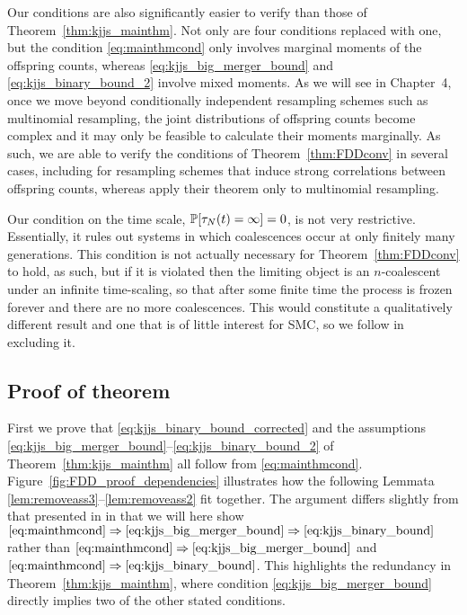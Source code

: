 Our conditions are also significantly easier to verify than those of Theorem~\ref{thm:kjjs_mainthm}. Not only are four conditions replaced with one, but the condition \eqref{eq:mainthmcond} only involves marginal moments of the offspring counts, whereas \eqref{eq:kjjs_big_merger_bound} and \eqref{eq:kjjs_binary_bound_2} involve mixed moments. 
As we will see in Chapter~4, once we move beyond conditionally independent resampling schemes such as multinomial resampling, the joint distributions of offspring counts become complex and it may only be feasible to calculate their moments marginally. 
As such, we are able to verify the conditions of Theorem~\ref{thm:FDDconv} in several cases, including for resampling schemes that induce strong correlations between offspring counts, whereas \textcite{koskela2018} apply their theorem only to multinomial resampling.

Our condition on the time scale, $\mathbb{P}[ \tau_N(t) = \infty ] =0$, is not very restrictive. Essentially, it rules out systems in which coalescences occur at only finitely many generations. 
This condition is not actually necessary for Theorem~\ref{thm:FDDconv} to hold, as such, but if it is violated then the limiting object is an $n$-coalescent under an infinite time-scaling, so that after some finite time the process is frozen forever and there are no more coalescences.
This would constitute a qualitatively different result and one that is of little interest for SMC, so we follow \textcite{mohle1998} in excluding it.


\subsection{Proof of theorem}

First we prove that \eqref{eq:kjjs_binary_bound_corrected} and the assumptions \eqref{eq:kjjs_big_merger_bound}--\eqref{eq:kjjs_binary_bound_2} of Theorem~\ref{thm:kjjs_mainthm} all follow from \eqref{eq:mainthmcond}.
Figure~\ref{fig:FDD_proof_dependencies} illustrates how the following Lemmata \ref{lem:removeass3}--\ref{lem:removeass2} fit together. 
The argument differs slightly from that presented in \textcite{brown2021} in that we will here show $\eqref{eq:mainthmcond} \Rightarrow \eqref{eq:kjjs_big_merger_bound} \Rightarrow \eqref{eq:kjjs_binary_bound}$ rather than $\eqref{eq:mainthmcond} \Rightarrow \eqref{eq:kjjs_big_merger_bound}$ and $\eqref{eq:mainthmcond} \Rightarrow \eqref{eq:kjjs_binary_bound}$.
This highlights the redundancy in Theorem~\ref{thm:kjjs_mainthm}, where condition \eqref{eq:kjjs_big_merger_bound} directly implies two of the other stated conditions.

